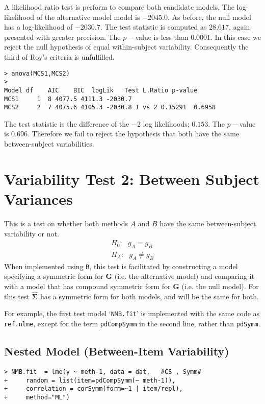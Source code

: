 \documentclass[12pt, a4paper]{report}
\theoremstyle{plain}
\theoremstyle{definition}
\theoremstyle{remark}
\begin{document}
A likelihood ratio test is perform to compare both candidate models. The log-likelihood of the alternative model model is $-2045.0$. As before, the null model has a log-likelihood of $-2030.7$. The test statistic is computed as $28.617$, again presented with greater precision. The $p-$value is less than $0.0001$. In this case we reject the null hypothesis of equal within-subject variability. Consequently the third of Roy's criteria is unfulfilled.
\begin{framed}
\begin{verbatim}
> anova(MCS1,MCS2)
>
Model df    AIC    BIC  logLik   Test L.Ratio p-value
MCS1     1  8 4077.5 4111.3 -2030.7
MCS2     2  7 4075.6 4105.3 -2030.8 1 vs 2 0.15291  0.6958
\end{verbatim}
\end{framed}

The test statistic is the difference of the $-2$ log likelihoods; $0.153$. The $p-$value is $0.696$. Therefore we fail to reject the hypothesis that both have the same between-subject variabilities.

\newpage
\section{Variability Test 2: Between Subject Variances}
This is a test on whether both methods $A$ and $B$ have the same between-subject variability or not.
\begin{eqnarray}
H_{0}: \mbox{ }g_{A}  = g_{B} \\
H_{A}: \mbox{ }g_{A}  \neq g_{B}
\end{eqnarray}
When implemented using \texttt{R}, this test is facilitated by constructing a model specifying a symmetric form for $\boldsymbol{G}$ (i.e. the alternative model) and comparing it with a model that has compound symmetric form for $\boldsymbol{G}$ (i.e. the null model). For this test $\boldsymbol{\hat{\Sigma}}$ has a symmetric form for both models, and will be the same for both.


For example, the first test model `\texttt{NMB.fit}' is implemented with the same code as \texttt{ref.nlme}, except for the term \texttt{pdCompSymm} in the second line, rather than \texttt{pdSymm}.

\subsection{Nested Model (Between-Item Variability)}
\begin{framed}
\begin{verbatim}
> NMB.fit  = lme(y ~ meth-1, data = dat,   #CS , Symm#
+     random = list(item=pdCompSymm(~ meth-1)),
+     correlation = corSymm(form=~1 | item/repl), 
+     method="ML")
\end{verbatim}
\end{framed}
\end{document}
